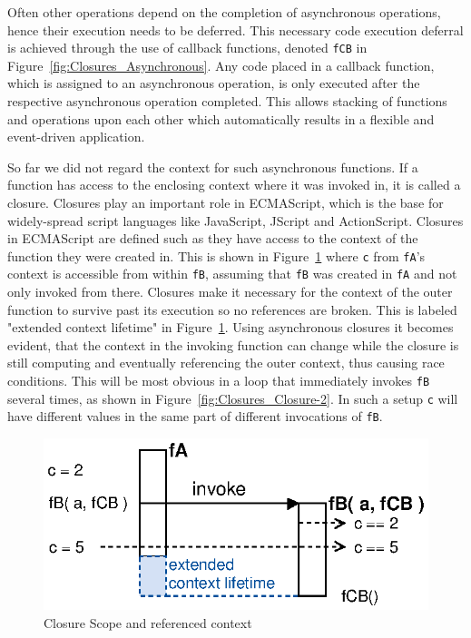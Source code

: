Often other operations depend on the completion of asynchronous operations, hence their execution needs to be deferred.
This necessary code execution deferral is achieved through the use of callback functions, denoted \texttt{fCB} in Figure~\ref{fig:Closures_Asynchronous}.
Any code placed in a callback function, which is assigned to an asynchronous operation, is only executed after the respective asynchronous operation completed.
This allows stacking of functions and operations upon each other which automatically results in a flexible and event-driven application.

So far we did not regard the context for such asynchronous functions.
If a function has access to the enclosing context where it was invoked in, it is called a closure.
Closures play an important role in \textrm{ECMAScript}\cite{EcmaScript}, which is the base for widely-spread script languages like JavaScript, JScript and ActionScript.
Closures in \textrm{ECMAScript} are defined such as they have access to the context of the function they were created in.
This is shown in Figure~\ref{fig:Closures_Closure-1} where \texttt{c} from \texttt{fA}'s context is accessible from within \texttt{fB}, assuming that \texttt{fB} was created in \texttt{fA} and not only invoked from there.
Closures make it necessary for the context of the outer function to survive past its execution so no references are broken.
This is labeled "extended context lifetime" in Figure~\ref{fig:Closures_Closure-1}.
Using asynchronous closures it becomes evident, that the context in the invoking function can change while the closure is still computing and eventually referencing the outer context, thus causing race conditions.
This will be most obvious in a loop that immediately invokes \texttt{fB} several times, as shown in Figure~\ref{fig:Closures_Closure-2}.
In such a setup \texttt{c} will have different values in the same part of different invocations of \texttt{fB}.
\begin{figure}[!ht]
	\centering
  \includegraphics{figures/Closures_Closure-1}
	\caption{Closure Scope and referenced context}
	\label{fig:Closures_Closure-1}
\end{figure}
